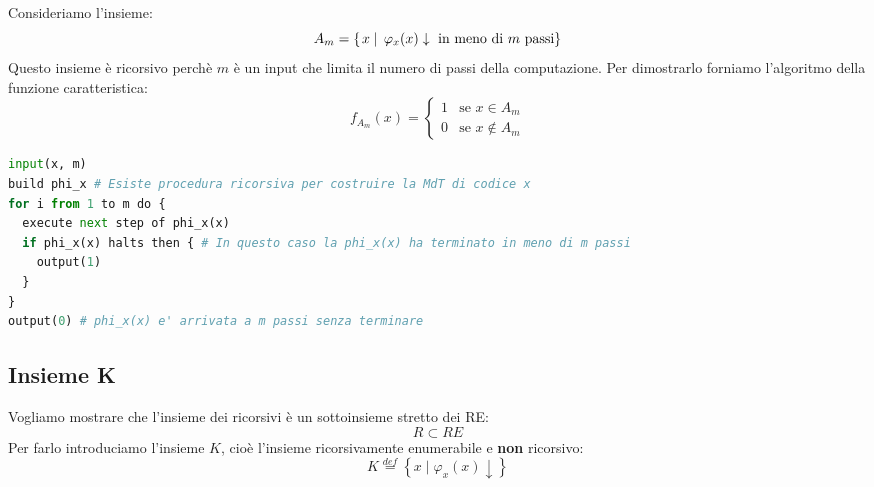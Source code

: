 \documentclass[a4paper]{article}
\begin{document}
\begin{example}
  Consideriamo l'insieme:
  \[
    A_m = \left\{ \left. x \;\right|\; \varphi_x(x) \downarrow \text{ in meno di \( m \) passi} \right\}
  \] 
  Questo insieme è ricorsivo perchè \( m \) è un input che limita il numero di passi della
  computazione. Per dimostrarlo forniamo l'algoritmo della funzione caratteristica:
  \[
    f_{A_m}(x) =
    \begin{cases}
      1 & \text{se } x \in A_m \\
      0 & \text{se } x \notin A_m
    \end{cases}
  \] 
\begin{lstlisting}[language=Python]
input(x, m)
build phi_x # Esiste procedura ricorsiva per costruire la MdT di codice x
for i from 1 to m do {
  execute next step of phi_x(x)
  if phi_x(x) halts then { # In questo caso la phi_x(x) ha terminato in meno di m passi
    output(1)
  }
}
output(0) # phi_x(x) e' arrivata a m passi senza terminare
\end{lstlisting}
\end{example}

\subsection{Insieme K}
Vogliamo mostrare che l'insieme dei ricorsivi è un sottoinsieme stretto dei RE:
\[
  R \subset RE
\] 
Per farlo introduciamo l'insieme \( K \), cioè l'insieme ricorsivamente
enumerabile e \textbf{non} ricorsivo:
\[
  K \stackrel{def}{=} \left\{ \left. x \;\right|\; \varphi_x(x) \downarrow \right\}
\] 
\end{document}
